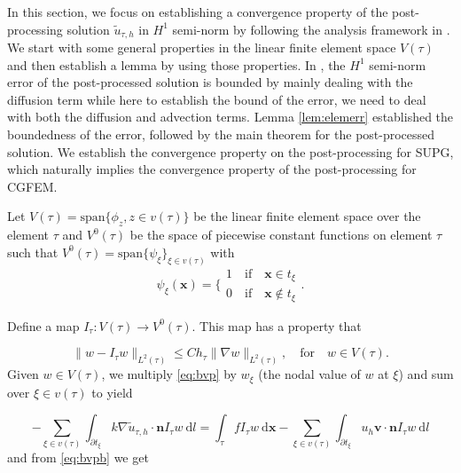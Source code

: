 \documentclass[times]{nlaauth}
\numberwithin{equation}{section}
\begin{document}
In this section, we focus on establishing a convergence property of the post-processing solution $\widetilde u_{\tau, h}$ in $H^1$ semi-norm by following the analysis framework in \cite{bush2013application}. We start with some general properties in the linear finite element space $V(\tau)$ and then establish a lemma by using those properties. In \cite{bush2013application}, the $H^1$ semi-norm error of the post-processed solution is bounded by mainly dealing with the diffusion term while here to establish the bound of the error, we need to deal with both the diffusion and advection terms. Lemma \ref{lem:elemerr} established the boundedness of the error, followed by the main theorem for the post-processed solution. We establish the convergence property on the post-processing for SUPG, which naturally implies the convergence property of the post-processing for CGFEM.

Let $V(\tau) = \text{span}\{ \phi_z, z \in v(\tau)\}$ be the linear finite element space over the element $\tau$ and $V^0(\tau)$ be the space of piecewise constant functions on element $\tau$ such that $V^0(\tau) = \text{span} \{ \psi_\xi \}_{\xi \in v(\tau)}$ with 
$$
\psi_\xi(\boldsymbol{x}) = \Big\lbrace\begin{array}{c} 1 \quad \text{if} \quad \boldsymbol{x} \in t_\xi  \\ 0 \quad \text{if} \quad \boldsymbol{x} \notin t_\xi \end{array}.
$$

\noindent
Define a map $I_\tau: V(\tau) \rightarrow V^0(\tau)$.  This map has a property \cite{chou2000error, chatzipantelidis2002finite} that 

\begin{equation} \label{eq:interr}
\| w - I_\tau w \|_{L^2(\tau)} \leq C h_\tau \| \nabla w \|_{L^2(\tau)}, \quad \text{for} \quad w \in V(\tau).
\end{equation}
Given $w\in V(\tau)$, we multiply \eqref{eq:bvp} by $w_\xi$ (the nodal value of $w$ at $\xi$) and sum over $\xi \in v(\tau)$ to yield 

\begin{equation} \label{eq:bvpsum}
-\sum_{\xi\in v(\tau)} \int_{\partial t_\xi} k \nabla \widetilde u_{\tau, h}  \cdot \boldsymbol{n} I_\tau w \ \text{d} l = \int_\tau f I_\tau w \ \text{d} \boldsymbol{x} -  \sum_{\xi\in v(\tau)} \int_{\partial t_\xi } u_h \boldsymbol{v} \cdot \boldsymbol{n}    I_\tau w \ \text{d} l
\end{equation}
and from \eqref{eq:bvpb} we get
\end{document}
